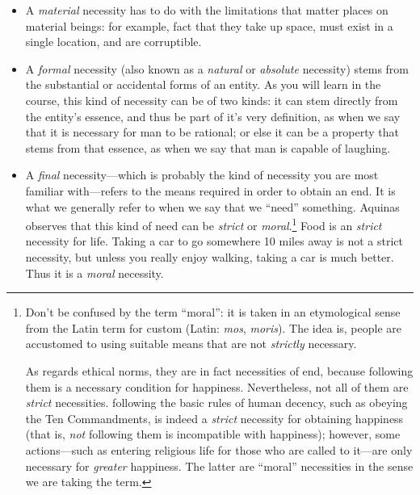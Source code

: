 \documentclass[
  12pt,
]{memoir}
\providecommand{\tightlist}{%
  \setlength{\itemsep}{0pt}\setlength{\parskip}{0pt}}
\begin{document}
\begin{itemize}
\tightlist
\item
  A \emph{material} necessity has to do with the limitations that matter
  places on material beings: for example, fact that they take up space,
  must exist in a single location, and are corruptible.
\item
  A \emph{formal} necessity (also known as a \emph{natural} or
  \emph{absolute} necessity) stems from the substantial or accidental
  forms of an entity. As you will learn in the course, this kind of
  necessity can be of two kinds: it can stem directly from the entity's
  essence, and thus be part of it's very definition, as when we say that
  it is necessary for man to be rational; or else it can be a property
  that stems from that essence, as when we say that man is capable of
  laughing.
\item
  A \emph{final} necessity---which is probably the kind of necessity you
  are most familiar with---refers to the means required in order to
  obtain an end. It is what we generally refer to when we say that we
  ``need'' something. Aquinas observes that this kind of need can be
  \emph{strict} or \emph{moral}.\footnote{Don't be confused by the term
    ``moral'': it is taken in an etymological sense from the Latin term
    for custom (Latin: \emph{mos}, \emph{moris}). The idea is, people
    are accustomed to using suitable means that are not \emph{strictly}
    necessary.

    As regards ethical norms, they are in fact necessities of end,
    because following them is a necessary condition for happiness.
    Nevertheless, not all of them are \emph{strict} necessities.
    following the basic rules of human decency, such as obeying the Ten
    Commandments, is indeed a \emph{strict} necessity for obtaining
    happiness (that is, \emph{not} following them is incompatible with
    happiness); however, some actions---such as entering religious life
    for those who are called to it---are only necessary for
    \emph{greater} happiness. The latter are ``moral'' necessities in
    the sense we are taking the term.} Food is an \emph{strict}
  necessity for life. Taking a car to go somewhere 10 miles away is not
  a strict necessity, but unless you really enjoy walking, taking a car
  is much better. Thus it is a \emph{moral} necessity.
\end{itemize}
\end{document}
